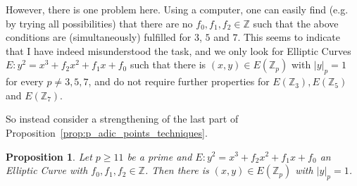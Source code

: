 \documentclass{scrartcl}
\newcommand{\Z}{\mathbb{Z}}
\newtheorem{prop}{Proposition}
\theoremstyle{definition}
\begin{document}
However, there is one problem here.
Using a computer, one can easily find (e.g. by trying all possibilities) that there are no $f_0, f_1, f_2 \in \Z$ such that the above conditions are (simultaneously) fulfilled for $3$, $5$ and $7$.
This seems to indicate that I have indeed misunderstood the task, and we only look for Elliptic Curves $E: y^2 = x^3 + f_2 x^2 + f_1 x + f_0$ such that there is $(x, y) \in E(\Z_p)$ with $|y|_p = 1$ for every $p \neq 3, 5, 7$, and do not require further properties for $E(\Z_3), E(\Z_5)$ and $E(\Z_7)$.

So instead consider a strengthening of the last part of Proposition~\ref{prop:p_adic_points_techniques}.
\begin{prop}
    \label{prop:points_in_EZp}
    Let $p \geq 11$ be a prime and $E: y^2 = x^3 + f_2 x^2 + f_1 x + f_0$ an Elliptic Curve with $f_0, f_1, f_2 \in \Z$.
    Then there is $(x, y) \in E(\Z_p)$ with $|y|_p = 1$.
\end{prop}
\end{document}
